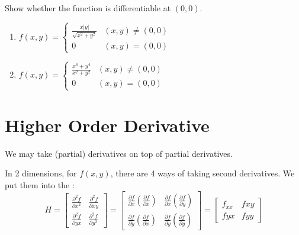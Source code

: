 \documentclass[11pt,fleqn]{book} %
\begin{document}
\begin{exercise}
    Show whether the function is differentiable at $(0, 0)$.

    \begin{enumerate}[label=\alph*)]
        \item $f(x, y) = \begin{cases}
            \frac{x|y|}{\sqrt{x^2 + y^2}} & (x, y) \neq (0, 0) \\
            0                             & (x, y) = (0, 0)
        \end{cases}$

        \item $f(x, y) = \begin{cases}
            \frac{x^4 + y^4}{x^2 + y^2} & (x, y) \neq (0, 0) \\
            0                           & (x, y) = (0, 0)
        \end{cases}$
    \end{enumerate}
\end{exercise}

\section{Higher Order Derivative}

We may take (partial) derivatives on top of partial derivatives. 

In 2 dimensions, for $f(x, y)$, there are 4 ways of taking second derivatives. We put them into the : 
$$H = \begin{bmatrix}
    \frac{\partial^2 f}{\partial x^2} & \frac{\partial^2 f}{\partial xy}  \\
    \frac{\partial^2 f}{\partial yx}  & \frac{\partial^2 f}{\partial y^2}
\end{bmatrix} = \begin{bmatrix}
    \frac{\partial f}{\partial x}\left( \frac{\partial f}{\partial x} \right) & 
    \frac{\partial f}{\partial x}\left( \frac{\partial f}{\partial y} \right)   \\
    \frac{\partial f}{\partial y}\left( \frac{\partial f}{\partial x} \right) & 
    \frac{\partial f}{\partial y}\left( \frac{\partial f}{\partial y} \right)
\end{bmatrix} = \begin{bmatrix}
    f_{xx} & f{xy} \\ f{yx} & f{yy}
\end{bmatrix}$$
\end{document}

